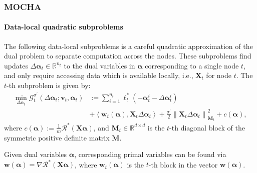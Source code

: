 \documentclass[UTF8,aspectratio=169,presentation]{ctexbeamer}
\begin{document}
\begin{frame}[t]
  \frametitle{MOCHA}
  \framesubtitle{Data-local quadratic subproblems}

  The following
  data-local subproblems is a careful quadratic approximation of the dual problem to separate computation across the nodes. These subproblems find updates $\Delta \boldsymbol \alpha _t \in \mathbb R^{n_t}$ to the dual
  variables in $\boldsymbol\alpha$ corresponding to a single node $t$, and only require accessing data which is available locally, i.e., $\mathbf X_t$ for node $t$. The $t$-th subproblem is given by:
  \begin{align*}
    \min _{\Delta \alpha_{t}} \mathcal{G}_{t}^{\sigma^{\prime}}\left(\Delta \boldsymbol{\alpha}_{t} ; \mathbf{v}_{t}, \boldsymbol{\alpha}_{t}\right) &:=\sum_{i=1}^{n_{t}} \ell_{t}^{*}\left(-\boldsymbol{\alpha}_{t}^{i}-\Delta \boldsymbol{\alpha}_{t}^{i}\right) \\
  & +\left\langle\mathbf{w}_{t}(\boldsymbol{\alpha}), \mathbf{X}_{t} \Delta \boldsymbol{\alpha}_{t}\right\rangle+\frac{\sigma^{\prime}}{2}\left\|\mathbf{X}_{t} \Delta \boldsymbol{\alpha}_{t}\right\|_{\mathbf{M}_{t}}^{2}+c(\boldsymbol{\alpha}),
  \end{align*}
  where $c(\boldsymbol\alpha) := \frac{1}{m} \mathcal R^{*}({\mathbf X \boldsymbol \alpha})$, and $\mathbf M_t \in \mathbb R^{d \times d}$ is the $t$-th diagonal block of the symmetric positive definite matrix $\mathbf M$.

  Given dual variables $\boldsymbol\alpha$, corresponding primal variables can be found via $\mathbf w (\boldsymbol \alpha) = \nabla {\mathcal{R}^{*}} (\mathbf X \boldsymbol\alpha) $, where $\mathbf w_t(\boldsymbol\alpha)$ is the $t$-th block in the vector $\mathbf{w}(\boldsymbol\alpha)$.


\end{frame}
\end{document}
